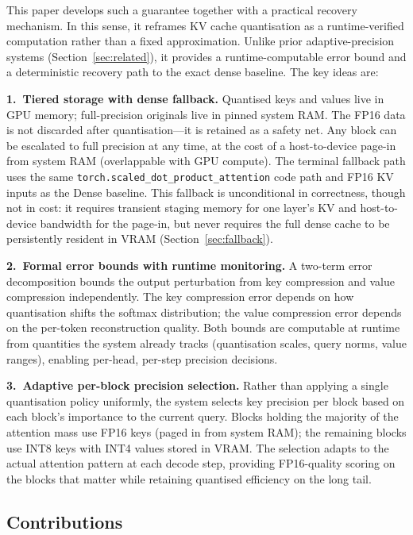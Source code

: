 \documentclass[10pt,twocolumn,a4paper]{article}
\theoremstyle{definition}
\theoremstyle{remark}
\newcommand{\torchsdpa}{\texttt{torch.scaled\_\hspace{0pt}dot\_\hspace{0pt}product\_\hspace{0pt}attention}}
\begin{document}
This paper develops such a guarantee together with a practical recovery mechanism.  In this sense, it reframes KV cache quantisation as a runtime-verified computation rather than a fixed approximation.  Unlike prior adaptive-precision systems (Section~\ref{sec:related}), it provides a runtime-computable error bound and a deterministic recovery path to the exact dense baseline.  The key ideas are:

\textbf{1.\ Tiered storage with dense fallback.}  Quantised keys and values live in GPU memory; full-precision originals live in pinned system RAM\@.  The FP16 data is not discarded after quantisation---it is retained as a safety net.  Any block can be escalated to full precision at any time, at the cost of a host-to-device page-in from system RAM (overlappable with GPU compute).  The terminal fallback path uses the same \torchsdpa{} code path and FP16 KV inputs as the Dense baseline.  This fallback is unconditional in correctness, though not in cost: it requires transient staging memory for one layer's KV and host-to-device bandwidth for the page-in, but never requires the full dense cache to be persistently resident in VRAM (Section~\ref{sec:fallback}).

\textbf{2.\ Formal error bounds with runtime monitoring.}  A two-term error decomposition bounds the output perturbation from key compression and value compression independently.  The key compression error depends on how quantisation shifts the softmax distribution; the value compression error depends on the per-token reconstruction quality.  Both bounds are computable at runtime from quantities the system already tracks (quantisation scales, query norms, value ranges), enabling per-head, per-step precision decisions.

\textbf{3.\ Adaptive per-block precision selection.}  Rather than applying a single quantisation policy uniformly, the system selects key precision per block based on each block's importance to the current query.  Blocks holding the majority of the attention mass use FP16 keys (paged in from system RAM); the remaining blocks use INT8 keys with INT4 values stored in VRAM.  The selection adapts to the actual attention pattern at each decode step, providing FP16-quality scoring on the blocks that matter while retaining quantised efficiency on the long tail.

\subsection{Contributions}
\end{document}
